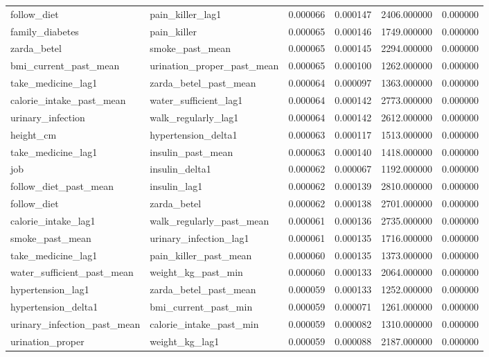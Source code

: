 \begin{longtable}{llrrrr}
follow\_diet & pain\_killer\_lag1 & 0.000066 & 0.000147 & 2406.000000 & 0.000000 \\
family\_diabetes & pain\_killer & 0.000065 & 0.000146 & 1749.000000 & 0.000000 \\
zarda\_betel & smoke\_past\_mean & 0.000065 & 0.000145 & 2294.000000 & 0.000000 \\
bmi\_current\_past\_mean & urination\_proper\_past\_mean & 0.000065 & 0.000100 & 1262.000000 & 0.000000 \\
take\_medicine\_lag1 & zarda\_betel\_past\_mean & 0.000064 & 0.000097 & 1363.000000 & 0.000000 \\
calorie\_intake\_past\_mean & water\_sufficient\_lag1 & 0.000064 & 0.000142 & 2773.000000 & 0.000000 \\
urinary\_infection & walk\_regularly\_lag1 & 0.000064 & 0.000142 & 2612.000000 & 0.000000 \\
height\_cm & hypertension\_delta1 & 0.000063 & 0.000117 & 1513.000000 & 0.000000 \\
take\_medicine\_lag1 & insulin\_past\_mean & 0.000063 & 0.000140 & 1418.000000 & 0.000000 \\
job & insulin\_delta1 & 0.000062 & 0.000067 & 1192.000000 & 0.000000 \\
follow\_diet\_past\_mean & insulin\_lag1 & 0.000062 & 0.000139 & 2810.000000 & 0.000000 \\
follow\_diet & zarda\_betel & 0.000062 & 0.000138 & 2701.000000 & 0.000000 \\
calorie\_intake\_lag1 & walk\_regularly\_past\_mean & 0.000061 & 0.000136 & 2735.000000 & 0.000000 \\
smoke\_past\_mean & urinary\_infection\_lag1 & 0.000061 & 0.000135 & 1716.000000 & 0.000000 \\
take\_medicine\_lag1 & pain\_killer\_past\_mean & 0.000060 & 0.000135 & 1373.000000 & 0.000000 \\
water\_sufficient\_past\_mean & weight\_kg\_past\_min & 0.000060 & 0.000133 & 2064.000000 & 0.000000 \\
hypertension\_lag1 & zarda\_betel\_past\_mean & 0.000059 & 0.000133 & 1252.000000 & 0.000000 \\
hypertension\_delta1 & bmi\_current\_past\_min & 0.000059 & 0.000071 & 1261.000000 & 0.000000 \\
urinary\_infection\_past\_mean & calorie\_intake\_past\_min & 0.000059 & 0.000082 & 1310.000000 & 0.000000 \\
urination\_proper & weight\_kg\_lag1 & 0.000059 & 0.000088 & 2187.000000 & 0.000000 \\

\end{longtable}
